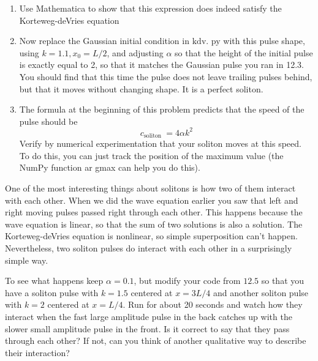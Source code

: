 \begin{problem}\label{P12.5}
\begin{enumerate}[label=(\alph*)]
\item Use Mathematica to show that this expression does indeed satisfy the
Korteweg-deVries equation
\item Now replace the Gaussian initial condition in $\mathrm{kdv}$. py with this pulse shape, using $k=1.1, x_{0}=L / 2$, and adjusting $\alpha$ so that the height of the initial pulse is exactly equal to 2, so that it matches the Gaussian pulse you ran in 12.3. You should find that this time the pulse does not leave trailing pulses behind, but that it moves without changing shape. It is a perfect soliton.
\item The formula at the beginning of this problem predicts that the speed of the pulse should be 
\begin{equation}\label{eq:1215}
c_{\text {soliton }}=4 \alpha k^{2}
\end{equation}
Verify by numerical experimentation that your soliton moves at this speed. To do this, you can just track the position of the maximum value (the NumPy function ar gmax can help you do this).
\end{enumerate}
\end{problem}
\begin{problem}\label{P12.6}
One of the most interesting things about solitons is how two of them interact with each other. When we did the wave equation earlier you saw that left and right moving pulses passed right through each other. This happens because the wave equation is linear, so that the sum of two solutions is also a solution. The Korteweg-deVries equation is nonlinear, so simple superposition can't happen. Nevertheless, two soliton pulses do interact with each other in a surprisingly simple way.

To see what happens keep $\alpha=0.1$, but modify your code from $12.5$ so that you have a soliton pulse with $k=1.5$ centered at $x=3 L / 4$ and another soliton pulse with $k=2$ centered at $x=L / 4$. Run for about 20 seconds and watch how they interact when the fast large amplitude pulse in the back catches up with the slower small amplitude pulse in the front. Is it correct to say that they pass through each other? If not, can you think of another qualitative way to describe their interaction?
\end{problem}
